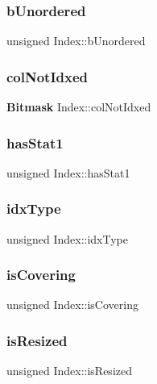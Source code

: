 \mbox{\label{struct_index_ae96b00c29b348bce9d58a5073fdb6d3e}} 
\subsubsection{bUnordered}
{\footnotesize\ttfamily unsigned Index\+::b\+Unordered}

\mbox{\label{struct_index_abb20fc6d7463369fdb4f589ee87a0a19}} 
\subsubsection{colNotIdxed}
{\footnotesize\ttfamily \textbf{ Bitmask} Index\+::col\+Not\+Idxed}

\mbox{\label{struct_index_ac989930fa29d766f5e209138b9a6ea01}} 
\subsubsection{hasStat1}
{\footnotesize\ttfamily unsigned Index\+::has\+Stat1}

\mbox{\label{struct_index_aebd62422c514bd90aab41606bec71032}} 
\subsubsection{idxType}
{\footnotesize\ttfamily unsigned Index\+::idx\+Type}

\mbox{\label{struct_index_ac4151fa2557d26d7c538f25a03d0b44e}} 
\subsubsection{isCovering}
{\footnotesize\ttfamily unsigned Index\+::is\+Covering}

\mbox{\label{struct_index_ad9c4a83513b3cf885782dcd459ed061f}} 
\subsubsection{isResized}
{\footnotesize\ttfamily unsigned Index\+::is\+Resized}

